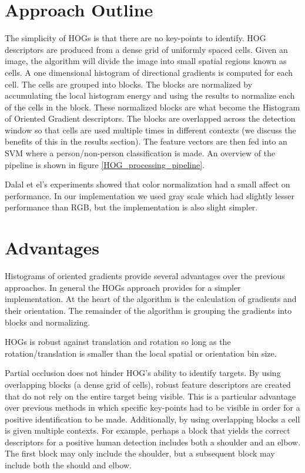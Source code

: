 \documentclass[a4paper,11pt]{article}
\begin{document}
\begin{multicols}{2}

\section{Approach Outline}
The simplicity of HOGs is that there are no key-points to identify. HOG descriptors are produced from a dense grid 
of uniformly spaced cells. Given an image, the algorithm will divide the image into small spatial regions known as 
cells. A one dimensional histogram of directional gradients is computed for each cell. The cells are grouped into 
blocks. The blocks are normalized by accumulating the local histogram energy and using the results to normalize each 
of the cells in the block. These normalized blocks are what become the Histogram of Oriented Gradient descriptors.
The blocks are overlapped across the detection window so that cells are used multiple times in different 
contexts (we discuss the benefits of this in the results section). The feature vectors are then fed into an 
SVM where a person/non-person classification is made. An overview of the pipeline is shown in 
figure \ref{HOG_processing_pipeline}. 

Dalal et el's experiments showed that color normalization had a small affect on performance. 
In our implementation we used gray scale which had slightly lesser performance than RGB, 
but the implementation is also slight simpler.

\section{Advantages}
Histograms of oriented gradients provide several advantages over the previous approaches. In general the HOGs 
approach provides for a simpler implementation. At the heart of the algorithm is the calculation of gradients 
and their orientation. The remainder of the algorithm is grouping the gradients into blocks and normalizing.

HOGs is robust against translation and rotation so long as the rotation/translation is smaller than the local 
spatial or orientation bin size.

Partial occlusion does not hinder HOG’s ability to identify targets. By using overlapping blocks (a dense grid of cells), 
robust feature descriptors are created that do not rely on the entire target being visible. This is a particular 
advantage over previous methods in which specific key-points had to be visible in order for a positive identification 
to be made. Additionally, by using overlapping blocks a cell is given multiple contexts. For example, perhaps 
a block that yields the correct descriptors for a positive human detection includes both a shoulder and an elbow.
The first block may only include the shoulder, but a subsequent block may include both the should and elbow.


\end{multicols}
\end{document}
